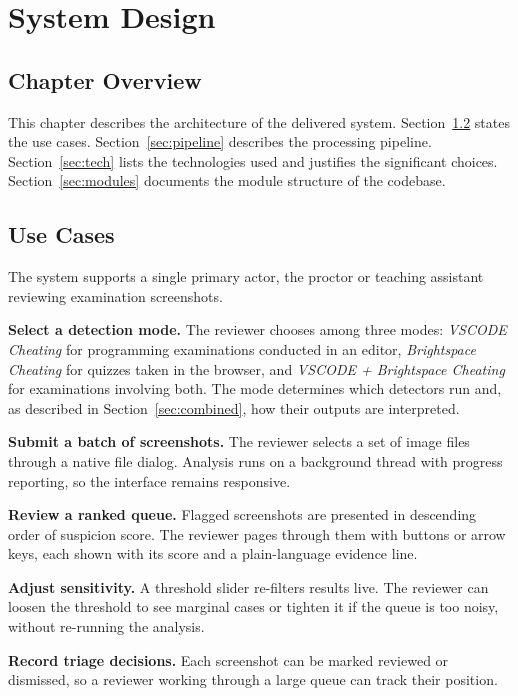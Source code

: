 \documentclass[12pt,oneside]{report}
\begin{document}
\chapter{System Design}
\label{ch:design}

\section{Chapter Overview}

This chapter describes the architecture of the delivered system.
Section~\ref{sec:usecases} states the use cases. Section~\ref{sec:pipeline}
describes the processing pipeline. Section~\ref{sec:tech} lists the
technologies used and justifies the significant choices.
Section~\ref{sec:modules} documents the module structure of the codebase.

\section{Use Cases}
\label{sec:usecases}

The system supports a single primary actor, the proctor or teaching assistant
reviewing examination screenshots.

\textbf{Select a detection mode.} The reviewer chooses among three modes:
\emph{VSCODE Cheating} for programming examinations conducted in an editor,
\emph{Brightspace Cheating} for quizzes taken in the browser, and
\emph{VSCODE + Brightspace Cheating} for examinations involving both. The mode
determines which detectors run and, as described in
Section~\ref{sec:combined}, how their outputs are interpreted.

\textbf{Submit a batch of screenshots.} The reviewer selects a set of image
files through a native file dialog. Analysis runs on a background thread with
progress reporting, so the interface remains responsive.

\textbf{Review a ranked queue.} Flagged screenshots are presented in descending
order of suspicion score. The reviewer pages through them with buttons or arrow
keys, each shown with its score and a plain-language evidence line.

\textbf{Adjust sensitivity.} A threshold slider re-filters results live. The
reviewer can loosen the threshold to see marginal cases or tighten it if the
queue is too noisy, without re-running the analysis.

\textbf{Record triage decisions.} Each screenshot can be marked reviewed or
dismissed, so a reviewer working through a large queue can track their
position.
\end{document}
